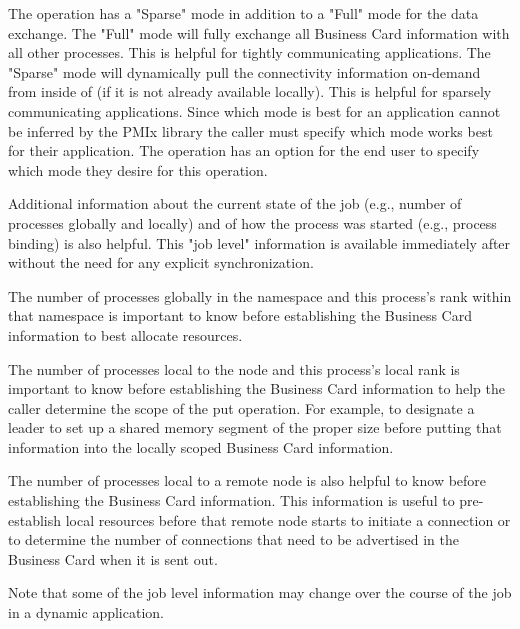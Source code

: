 The  operation has a "Sparse" mode in addition to a "Full" mode for the data exchange. The "Full" mode will fully exchange all Business Card information with all other processes. This is helpful for tightly communicating applications. The "Sparse" mode will dynamically pull the connectivity information on-demand from inside of  (if it is not already available locally). This is helpful for sparsely communicating applications. Since which mode is best for an application cannot be inferred by the PMIx library the caller must specify which mode works best for their application. The  operation has an option for the end user to specify which mode they desire for this operation.

Additional information about the current state of the job (e.g., number of processes globally and locally) and of how the process was started (e.g., process binding) is also helpful. This "job level" information is available immediately after  without the need for any explicit synchronization.

The number of processes globally in the namespace and this process's rank within that namespace is important to know before establishing the Business Card information to best allocate resources.

The number of processes local to the node and this process's local rank is important to know before establishing the Business Card information to help the caller determine the scope of the put operation. For example, to designate a leader to set up a shared memory segment of the proper size before putting that information into the locally scoped Business Card information.

The number of processes local to a remote node is also helpful to know before establishing the Business Card information. This information is useful to pre-establish local resources before that remote node starts to initiate a connection or to determine the number of connections that need to be advertised in the Business Card when it is sent out.

Note that some of the job level information may change over the course of the job in a dynamic application.


{\large {}}

{\large {}}

{\large {}}

